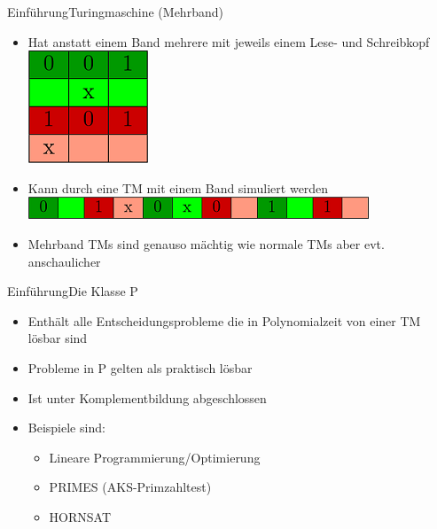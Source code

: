 \documentclass[ignorenonframetext,]{beamer}
\begin{document}
\begin{frame}{Einführung}{Turingmaschine (Mehrband)}

\begin{itemize}
\itemsep1pt\parskip0pt
\item
  Hat anstatt einem Band mehrere mit jeweils einem Lese- und
  Schreibkopf\\\includegraphics{img/TM1.png}
\item
  Kann durch eine TM mit einem Band simuliert
  werden\\\includegraphics{img/TM2.png}
\item
  Mehrband TMs sind genauso mächtig wie normale TMs aber evt.
  anschaulicher
\end{itemize}

\end{frame}

\begin{frame}{Einführung}{Die Klasse P}

\begin{itemize}
\itemsep1pt\parskip0pt
\item
  Enthält alle Entscheidungsprobleme die in Polynomialzeit von einer TM
  lösbar sind
\item
  Probleme in P gelten als praktisch lösbar
\item
  Ist unter Komplementbildung abgeschlossen
\item
  Beispiele sind:

  \begin{itemize}
  \itemsep1pt\parskip0pt
  \item
    Lineare Programmierung/Optimierung
  \item
    PRIMES (AKS-Primzahltest)
  \item
    HORNSAT
  \end{itemize}
\end{itemize}

\end{frame}
\end{document}
